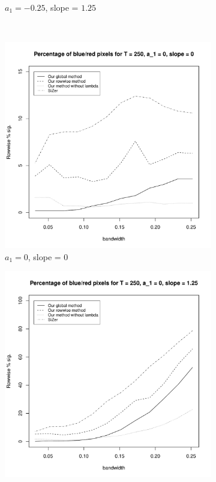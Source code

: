 \documentclass[a4paper,12pt]{article}
\begin{document}
\begin{figure}[t!]
\begin{subfigure}[b]{0.475\textwidth}
\caption{$a_1 = -0.25$, slope = $1.25$}
\end{subfigure}\\
\begin{subfigure}[b]{0.475\textwidth}
\includegraphics[width=\textwidth]{Plots/rowwise_sig_comparison_T_250_a1_0_slope_0.pdf}
\caption{$a_1 = 0$, slope = $0$}
\end{subfigure}\hspace{0.25cm}
\begin{subfigure}[b]{0.475\textwidth}
\includegraphics[width=\textwidth]{Plots/rowwise_sig_comparison_T_250_a1_0_slope_125.pdf}

\end{subfigure}
\end{figure}
\end{document}
